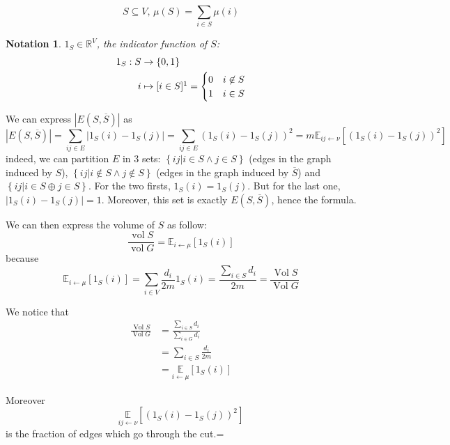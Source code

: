 \documentclass[12pt]{article}
\newtheorem{notation}{Notation}
\newcommand{\EE}{\mathbb{E}}
\newcommand{\RR}{\mathbb{R}}
\newcommand{\set}[1]{\left\{ #1 \right\}}
\newcommand{\la}{\leftarrow}
\newcommand{\opname}[1]{\operatorname{#1}}
\newcommand{\card}[1]{\left\lvert#1\right\rvert}
\newcommand{\esp}[2][]{\underset{#1}{\EE}\left[ #2 \right]}
\DeclareMathOperator{\vol}{Vol}
\begin{document}
\[
    S\subseteq V,\, \mu(S) = \sum\limits_{i\in S} \mu(i)
\]

\begin{notation}
    $1_S \in \RR^V$, the indicator function of $S$:
    \[
        \begin{aligned}
            1_S: S &\to \set{0,1}\\
            i &\mapsto [i\in S]\footnotemark
            = \begin{cases}
                    0 & i\not\in S\\
                    1 & i\in S
                \end{cases}     
        \end{aligned}
    \]
\end{notation}

We can express $\card{E(S,\overline{S})}$ as
\[
    \card{E(S,\overline{S})} = \sum\limits_{ij\in E} \lvert 1_S(i)-1_S(j)\rvert = \sum\limits_{ij\in E} \left( 1_S(i)-1_S(j)\right)^2 = m \EE_{ij \leftarrow \nu} \left[ \left( 1_S(i)-1_S(j)\right)^2 \right]
\]
indeed, we can partition $E$ in 3 sets: $\set{ij \vert i\in S \wedge j \in S}$ (edges in the graph induced by $S$), $\set{ij \vert i\not\in S \wedge j \not\in S}$ (edges in the graph induced by $\overline{S}$) and $\set{ij \vert i\in S \oplus j \in S}$. For the two firsts, $1_S(i) = 1_S(j)$. But for the last one, $\lvert 1_S(i) - 1_S(j)\rvert = 1$. Moreover, this set is exactly $E(S,\overline{S})$, hence the formula.

We can then express the volume of $S$ as follow:
\[
    \frac{\opname{vol} S}{\opname{vol} G} = \EE_{i \leftarrow \mu} \left[  1_S(i)\right]
\]
because
\[
    \EE_{i \leftarrow \mu} \left[  1_S(i)\right] = \sum_{i\in V} \frac {d_i} {2m} 1_S(i) = \frac { \sum_{i\in S} d_i} {2m} = \frac {\vol S} {\vol G}
\]

We notice that
\[
    \begin{aligned}
        \frac{\vol S}{\vol G} &= \frac{\sum\limits_{i\in S} d_i}{\sum\limits_{i\in G} d_i}\\
        &= \sum\limits_{i\in S}\frac{d_i}{2m}\\
        &= \esp[i\la\mu]{1_S(i)}
    \end{aligned}
\]

Moreover
\[
    \esp[ij\la\nu]{(1_S(i)-1_S(j))^2}
\]
is the fraction of edges which go through the cut.=
\end{document}
